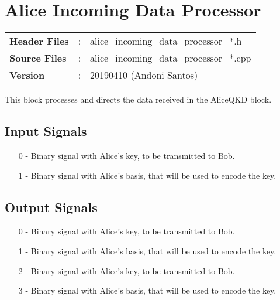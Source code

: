 \clearpage
\graphicspath{{./lib/alice_incoming_data_processor/figures/}}
\section{Alice Incoming Data Processor}

\begin{tcolorbox}	
	\begin{tabular}{p{2.75cm} p{0.2cm} p{10.5cm}} 	
        \textbf{Header Files}    &:& alice\_incoming\_data\_processor\_*.h \\
		\textbf{Source Files}    &:& alice\_incoming\_data\_processor\_*.cpp \\
        \textbf{Version}         &:& 20190410 (Andoni Santos)
	\end{tabular}
\end{tcolorbox}

\maketitle
This block processes and directs the data received in the AliceQKD block.

\subsection*{Input Signals}

\begin{itemize}
	\item[0] - Binary signal with Alice's key, to be transmitted to Bob.
	\item[1] - Binary signal with Alice's basis, that will be used to encode the key.
\end{itemize}

\subsection*{Output Signals}

\begin{itemize}
	\item[0] - Binary signal with Alice's key, to be transmitted to Bob.
	\item[1] - Binary signal with Alice's basis, that will be used to encode the key.
	\item[2] - Binary signal with Alice's key, to be transmitted to Bob.
	\item[3] - Binary signal with Alice's basis, that will be used to encode the key. 
\end{itemize}

